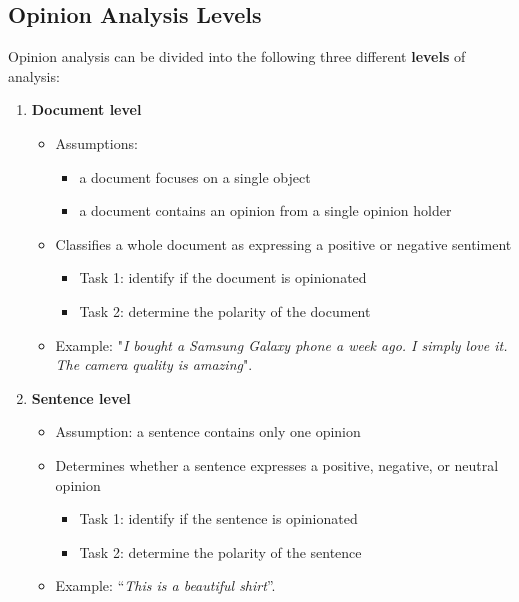 \documentclass{article}
\begin{document}
\subsection{Opinion Analysis Levels}
Opinion analysis can be divided into the following three different \textbf{levels} of analysis:
\begin{enumerate}[label=\Alph*]
    \item \textbf{Document level}
        \begin{itemize}
            \item Assumptions:
                \begin{itemize}
                    \item a document focuses on a single object
                    \item a document contains an opinion from a single opinion holder 
                \end{itemize}
            \item Classifies a whole document as expressing a positive or negative sentiment
                \begin{itemize}
                    \item Task 1: identify if the document is opinionated
                    \item Task 2: determine the polarity of the document
                \end{itemize}
            \item Example: "\textit{I bought a Samsung Galaxy phone a week ago. I simply love it. The camera quality is amazing}".
        \end{itemize}
    \item \textbf{Sentence level}
        \begin{itemize}
            \item Assumption: a sentence contains only one opinion
            \item Determines whether a sentence expresses a positive, negative, or neutral opinion
                \begin{itemize}
                    \item Task 1: identify if the sentence is opinionated
                    \item Task 2: determine the polarity of the sentence
                \end{itemize}
            \item Example: “\textit{This is a beautiful shirt}”.
        \end{itemize}

\end{enumerate}
\end{document}
